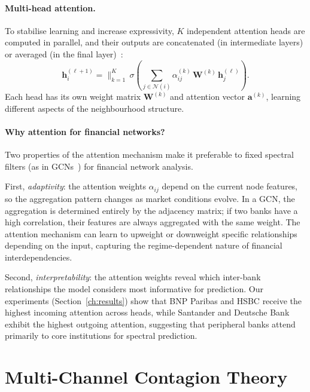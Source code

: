 \paragraph{Multi-head attention.}
To stabilise learning and increase expressivity, $K$ independent
attention heads are computed in parallel, and their outputs are
concatenated (in intermediate layers) or averaged (in the final
layer)~\cite{velickovic2018graph}:
\begin{equation}
\mathbf{h}_i^{(\ell+1)} = \Big\|_{k=1}^{K}\,\sigma\!\left(
\sum_{j \in \mathcal{N}(i)} \alpha_{ij}^{(k)}\,
\mathbf{W}^{(k)}\,\mathbf{h}_j^{(\ell)}\right).
\label{eq:multihead_gat}
\end{equation}
Each head has its own weight matrix $\mathbf{W}^{(k)}$ and attention
vector $\mathbf{a}^{(k)}$, learning different aspects of the
neighbourhood structure.

\paragraph{Why attention for financial networks?}
Two properties of the attention mechanism make it preferable to fixed
spectral filters (as in GCNs~\cite{kipf2017semi}) for financial
network analysis.

First, \emph{adaptivity}: the attention weights $\alpha_{ij}$ depend
on the current node features, so the aggregation pattern changes as
market conditions evolve.  In a GCN, the aggregation is determined
entirely by the adjacency matrix; if two banks have a high correlation,
their features are always aggregated with the same weight.  The
attention mechanism can learn to upweight or downweight specific
relationships depending on the input, capturing the regime-dependent
nature of financial interdependencies.

Second, \emph{interpretability}: the attention weights reveal which
inter-bank relationships the model considers most informative for
prediction.  Our experiments (Section~\ref{ch:results}) show that BNP
Paribas and HSBC receive the highest incoming attention across heads,
while Santander and Deutsche Bank exhibit the highest outgoing
attention, suggesting that peripheral banks attend primarily to core
institutions for spectral prediction.


\section{Multi-Channel Contagion Theory}
\label{sec:contagion_theory}

